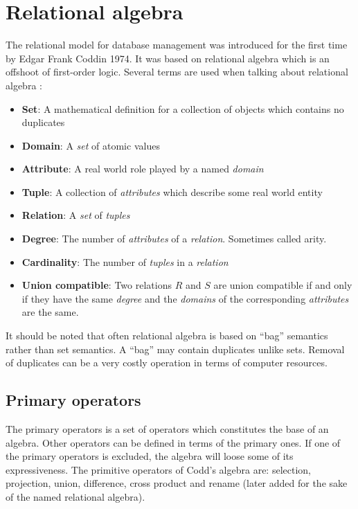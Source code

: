 \section{Relational algebra}
\label{sect:theory:relAlg}

The relational model for database management was introduced for the first time by Edgar Frank Coddin
1974\cite{TDT4225}. It was based on relational algebra which is an offshoot of first-order logic. Several terms
are used when talking about relational algebra \cite{gordonRussel}\cite{newYorkDB}\cite{sudarshan}:
\begin{itemize}
\item \textbf{Set}: A mathematical definition for a collection of objects which contains no duplicates
\item \textbf{Domain}: A \textit{set} of atomic values
\item \textbf{Attribute}: A real world role played by a named \textit{domain}
\item \textbf{Tuple}: A collection of \textit{attributes} which describe some real world entity
\item \textbf{Relation}: A \textit{set} of \textit{tuples}
\item \textbf{Degree}: The number of \textit{attributes} of a \textit{relation}. Sometimes called arity.
\item \textbf{Cardinality}: The number of \textit{tuples} in a \textit{relation}
\item \textbf{Union compatible}: Two relations $R$ and $S$ are union compatible if and only if they have the same
	\textit{degree} and the \textit{domains} of the corresponding \textit{attributes} are the same.
\end{itemize}

It should be noted that often relational algebra is based on ``bag'' semantics rather than set semantics. A
``bag'' may contain duplicates unlike sets. Removal of duplicates can be a very costly operation in terms of
computer resources.

\subsection{Primary operators}
\label{sect:theory:relAlg:primOper}
The primary operators is a set of operators which constitutes the base of an algebra. Other operators can be
defined in terms of the primary ones. If one of the primary operators is excluded, the algebra will loose some of
its expressiveness. The primitive operators of Codd's algebra are: selection, projection, union, difference,
cross product and rename (later added for the sake of the named relational algebra).

